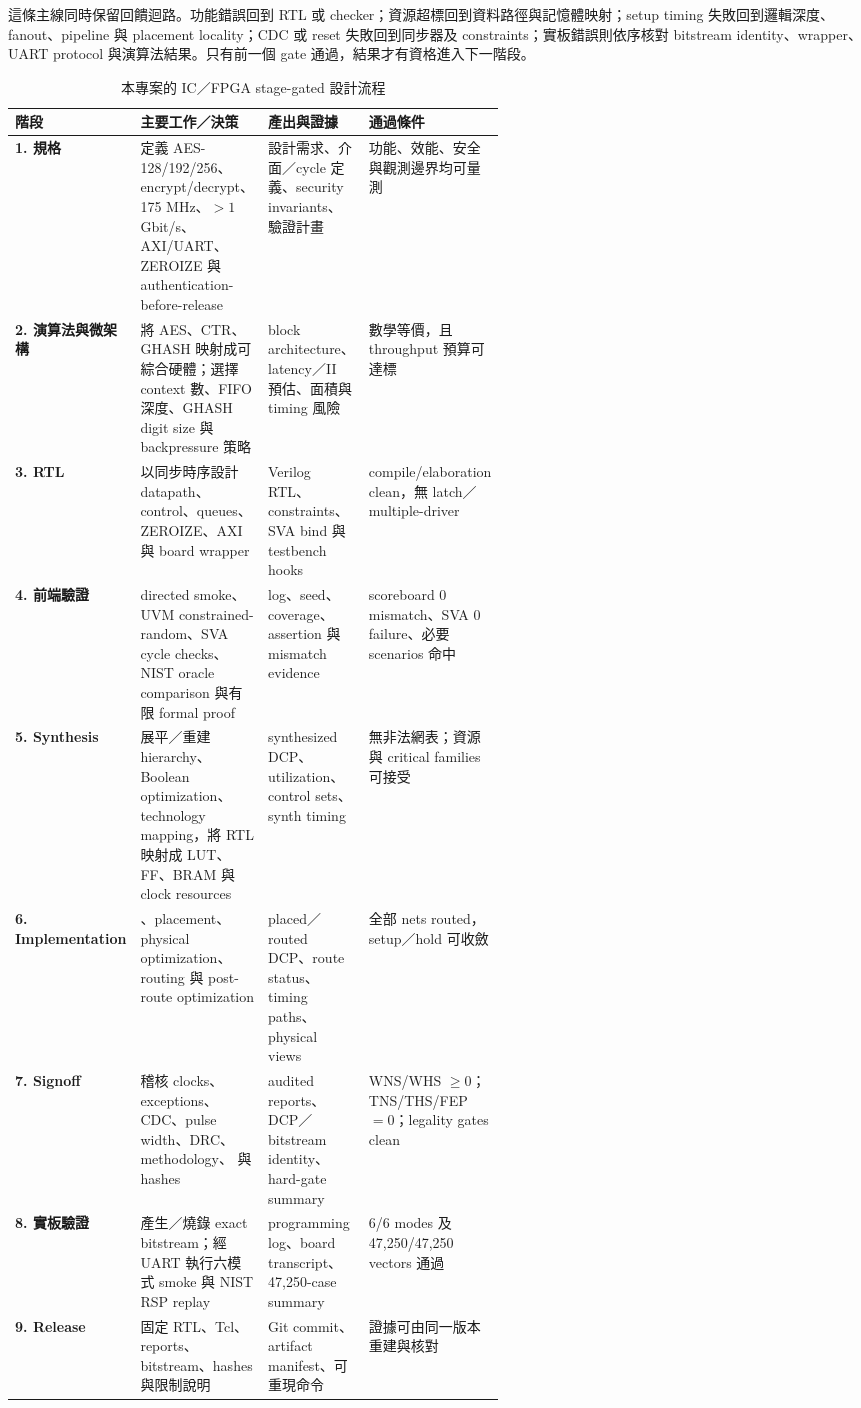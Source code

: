 \documentclass[UTF8,fontset=none,11pt,a4paper]{ctexrep}
\newcommand{\code}[1]{\texttt{\detokenize{#1}}}
\begin{document}
這條主線同時保留回饋迴路。功能錯誤回到 RTL 或 checker；資源超標回到資料路徑與記憶體映射；setup timing 失敗回到邏輯深度、fanout、pipeline 與 placement locality；CDC 或 reset 失敗回到同步器及 constraints；實板錯誤則依序核對 bitstream identity、wrapper、UART protocol 與演算法結果。只有前一個 gate 通過，結果才有資格進入下一階段。

\begin{table}[H]
\centering
\scriptsize
\caption{本專案的 IC／FPGA stage-gated 設計流程}
\begin{tabularx}{\linewidth}{>{\bfseries}p{0.115\linewidth} p{0.23\linewidth} X p{0.22\linewidth}}
\toprule
階段 & 主要工作／決策 & 產出與證據 & 通過條件 \\
\midrule
1. 規格 & 定義 AES-128/192/256、encrypt/decrypt、175 MHz、$>1$ Gbit/s、AXI/UART、ZEROIZE 與 authentication-before-release & 設計需求、介面／cycle 定義、security invariants、驗證計畫 & 功能、效能、安全與觀測邊界均可量測 \\
2. 演算法與微架構 & 將 AES、CTR、GHASH 映射成可綜合硬體；選擇 context 數、FIFO 深度、GHASH digit size 與 backpressure 策略 & block architecture、latency／II 預估、面積與 timing 風險 & 數學等價，且 throughput 預算可達標 \\
3. RTL & 以同步時序設計 datapath、control、queues、ZEROIZE、AXI 與 board wrapper & Verilog RTL、constraints、SVA bind 與 testbench hooks & compile/elaboration clean，無 latch／multiple-driver \\
4. 前端驗證 & directed smoke、UVM constrained-random、SVA cycle checks、NIST oracle comparison 與有限 formal proof & log、seed、coverage、assertion 與 mismatch evidence & scoreboard 0 mismatch、SVA 0 failure、必要 scenarios 命中 \\
5. Synthesis & 展平／重建 hierarchy、Boolean optimization、technology mapping，將 RTL 映射成 LUT、FF、BRAM 與 clock resources & synthesized DCP、utilization、control sets、synth timing & 無非法網表；資源與 critical families 可接受 \\
6. Implementation & \code{opt\_design}、placement、physical optimization、routing 與 post-route optimization & placed／routed DCP、route status、timing paths、physical views & 全部 nets routed，setup／hold 可收斂 \\
7. Signoff & 稽核 clocks、exceptions、CDC、pulse width、DRC、methodology、\code{check\_timing} 與 hashes & audited reports、DCP／bitstream identity、hard-gate summary & WNS/WHS $\ge 0$；TNS/THS/FEP $=0$；legality gates clean \\
8. 實板驗證 & 產生／燒錄 exact bitstream；經 UART 執行六模式 smoke 與 NIST RSP replay & programming log、board transcript、47,250-case summary & 6/6 modes 及 47,250/47,250 vectors 通過 \\
9. Release & 固定 RTL、Tcl、reports、bitstream、hashes 與限制說明 & Git commit、artifact manifest、可重現命令 & 證據可由同一版本重建與核對 \\
\bottomrule
\end{tabularx}
\end{table}
\end{document}
